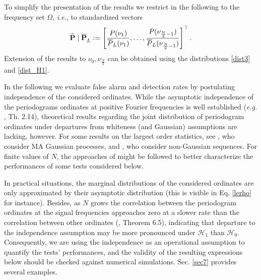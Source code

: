 \documentclass[journal]{IEEEtran}
\begin{document}
To simplify the presentation of the results we restrict in the following to the frequency set  $\Omega$, \textit{i.e.},
to standardized vectors
$$
{\bf{\widetilde{P}\;|\;\overline{P}}}_L:=\left[\frac{P(\nu_1)}{\overline{P}_L(\nu_1)},\hdots, \frac{P(\nu_{\frac{N}{2}-1})}{\overline{P}_L(\nu_{\frac{N}{2}-1})}\right]^\top.
$$
Extension of the results
to { $\nu_0,\nu_{\frac{N}{2}}$} can be obtained using the distributions \eqref{dist3} and \eqref{dist_H1}.

{
In the following we evaluate false alarm and detection rates by postulating independence of the considered ordinates.
While the asymptotic independence of the periodograms ordinates at positive Fourier frequencies is well established
(\textit{e.g.} \cite{Fan_2003}, Th. 2.14), theoretical results regarding the joint distribution of periodogram ordinates under departures from whiteness (and Gaussian) assumptions are lacking, however. For some results on the largest order statistics, see \cite{Turkman_1984}, who consider MA Gaussian processes, and \cite{Davis_1999}, who consider non-Gaussian sequences. For finite values of $N$, the approaches of \cite{Rife_1974,Quinn_1994} 
might be followed to better characterize the performances of some tests considered below.

In practical situations, the marginal distributions of the considered ordinates are only approximated by their asymptotic distribution 
(this is visible in Eq. \eqref{lerho} for instance).
Besides, as $N$ grows the correlation between the periodogram ordinates at the signal frequencies approaches zero at a slower rate than the correlation between other ordinates ($\!\!$\cite{Li_2014}, Theorem 6.5), indicating that departure to the independence assumption may be more pronounced under ${\mathcal{H}}_1$ than ${\mathcal{H}}_0$. Consequently,  we are using the independence as an operational assumption to quantify  the tests' performances, and the validity of the resulting expressions  below should be checked against numerical simulations. Sec. \ref{sec7} provides several examples.   }
 
\end{document}
